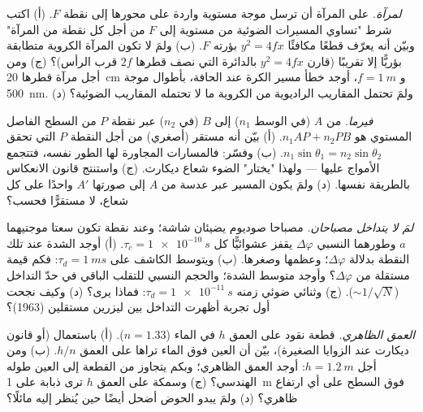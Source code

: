 \begin{exercise}[$\star\star$]\label{exo:b2:scalar-light-model:6}
\emph{ لمرآة.} على المرآة أن ترسل موجة مستوية واردة
على محورها إلى نقطة $F$. (أ) اكتب شرط "تساوي المسيرات
الضوئية من  مستوية إلى $F$ من أجل كل نقطة من المرآة"
وبيّن أنه يعرّف قطعًا مكافئًا $y^2 = 4fx$ بؤرته $F$. (ب) ولمَ لا تكون المرآة
الكروية متطابقة بؤريًّا إلا تقريبًا (قارن $y^2 = 4fx$ بالدائرة
التي نصف قطرها $2f$ قرب الرأس)؟ (ج) ومن أجل مرآة قطرها \qty{20}{cm}
و $f = \qty{1}{m}$، أوجد خطأ مسير الكرة عند الحافة، بأطوال
موجة \qty{500}{nm}. (د) ولمَ تحتمل المقاريب الراديوية من الكروية ما لا
تحتمله المقاريب الضوئية؟
\end{exercise}

\begin{exercise}[$\star\star$]\label{exo:b2:scalar-light-model:7}
\emph{فيرما.}  من $A$ (في الوسط $n_1$) إلى $B$ (في
$n_2$) عبر نقطة $P$ من السطح الفاصل المستوي هو $n_1AP + n_2PB$. (أ)
بيّن أنه مستقر (أصغري) من أجل النقطة $P$ التي تحقق
$n_1\sin\theta_1 = n_2\sin\theta_2$. (ب) وفسّر: فالمسارات المجاورة لها
الطور نفسه، فتتجمع الأمواج عليها --- ولهذا "يختار" الضوء
شعاع ديكارت. (ج) واستنتج قانون الانعكاس بالطريقة
نفسها. (د) ولمَ يكون المسير عبر عدسة من $A$ إلى صورتها $A'$
واحدًا على كل شعاع، لا مستقرًّا فحسب؟
\end{exercise}

\begin{exercise}[$\star\star$]\label{exo:b2:scalar-light-model:8}
\emph{لمَ لا يتداخل مصباحان.} مصباحا صوديوم يضيئان
شاشة؛ وعند نقطة تكون سعتا موجتيهما $a$ وطورهما النسبي
$\Delta\varphi$ يقفز عشوائيًّا كل $\tau_c = \qty{1e-10}{s}$. (أ)
أوجد الشدة عند تلك النقطة بدلالة $\Delta\varphi$؛ وعظمها وصغرها.
(ب) ويتوسط الكاشف على $\tau_d = \qty{1}{ms}$: فكم قيمة
مستقلة من $\Delta\varphi$؟ وأوجد متوسط الشدة؛ والحجم النسبي
للتقلب الباقي في حدّ التداخل ($\sim 1/\sqrt N$). (ج) وثنائي
ضوئي زمنه $\tau_d = \qty{1e-11}{s}$: فماذا يرى؟ (د) وكيف نجحت
أول تجربة أظهرت التداخل بين ليزرين مستقلين (1963)؟
\end{exercise}

\begin{exercise}[$\star\star$]\label{exo:b2:scalar-light-model:9}
\emph{العمق الظاهري.} قطعة نقود على العمق $h$ في الماء ($n = 1.33$).
(أ) باستعمال  (أو قانون ديكارت عند الزوايا الصغيرة)، بيّن
أن العين فوق الماء تراها على العمق $h/n$. (ب) ومن أجل $h = \qty{1.2}{m}$: أوجد العمق
الظاهري؛ وبكم يتجاوز  من القطعة إلى العين
طوله الهندسي؟ (ج) وسمكة على العمق $h$ ترى ذبابة على \qty{1}{m}
فوق السطح على أي ارتفاع ظاهري؟ (د) ولمَ يبدو الحوض
أضحل أيضًا حين يُنظر إليه مائلًا؟
\end{exercise}


